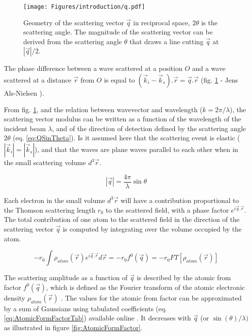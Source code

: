 \begin{figure}[!htb]
    \centering
    \texttt{[image: Figures/introduction/q.pdf]}
    \caption{
    Geometry of the scattering vector $\vec{q}$ in reciprocal space, $2\theta$ is the scattering angle.
    The magnitude of the scattering vector can be derived from the scattering angle $\theta$ that draws a line cutting $\vec{q}$ at $|\vec{q}|/2$.
    }
    \label{fig:q}
\end{figure}

The phase difference between a wave scattered at a position $O$ and a wave scattered at a distance $\vec{r}$ from $O$ is equal to $(\vec{k}_i - \vec{k}_s).\vec{r} = \vec{q}.\vec{r}$ (fig. \ref{fig:q} - Jens Als-Nielsen \cite*{NielsenMcMorrow}).

From fig. \ref{fig:q}, and the relation between wavevector and wavelength ($k = 2 \pi/\lambda$), the scattering vector modulus can be written as a function of the wavelength of the incident beam $\lambda$, and of the direction of detection defined by the scattering angle $2\theta$ (eq. \ref{eq:QSinTheta}).
Is it assumed here that the scattering event is elastic ($|\vec{k}_i|=|\vec{k}_s|$), and that the waves are plane waves parallel to each other when in the small scattering volume $d^3\vec{r}$.

\begin{equation}
    \label{eq:QSinTheta}
    |\vec{q}| = \frac{4\pi}{\lambda} \sin{\theta}
\end{equation}

Each electron in the small volume $d^3\vec{r}$ will have a contribution proportional to the Thomson scattering length $r_0$ to the scattered field, with a phase factor $e^{i\vec{q}.\vec{r}}$.
The total contribution of one atom to the scattered field in the direction of the scattering vector $\vec{q}$ is computed by integrating over the volume occupied by the atom.

\begin{equation}
    \label{eq:AtomicFormFactor}
    -r_0 \int \rho_{atom} (\vec{r}) e^{i\vec{q}.\vec{r}} d\vec{r} = -r_0 f^0(\vec{q}) = -r_0 FT [\rho_{atom} (\vec{r})]
\end{equation}

The scattering amplitude as a function of $\vec{q}$ is described by the atomic from factor $f^0(\vec{q})$, which is defined as the Fourier transform of the atomic electronic density $\rho_{atom}(\vec{r})$ \parencite{Paganin}.
The values for the atomic from factor can be approximated by a sum of Gaussians using tabulated coefficients (eq. \ref{eq:AtomicFormFactorTab}) available online \parencite{InterTablesOfCryst}.
It decreases with $\vec{q}$ (or $\sin(\theta) / \lambda)$ as illustrated in figure \ref{fig:AtomicFormFactor}.


